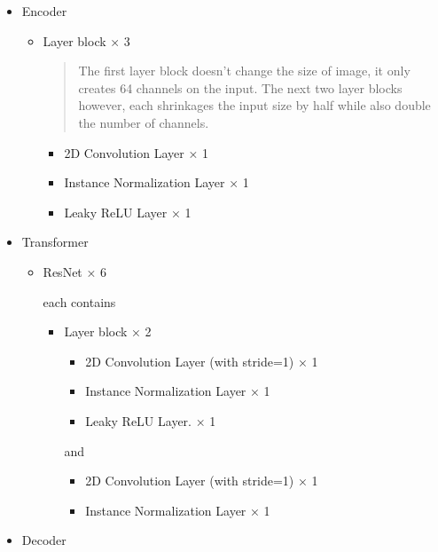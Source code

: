 \documentclass[
]{article}
\begin{document}
\begin{itemize}
\item
  Encoder

  \begin{itemize}
  \item
    Layer block × 3

    \begin{quote}
    The first layer block doesn't change the size of image, it only
    creates 64 channels on the input. The next two layer blocks however,
    each shrinkages the input size by half while also double the number
    of channels.
    \end{quote}

    \begin{itemize}
    \item
      2D Convolution Layer × 1
    \item
      Instance Normalization Layer × 1
    \item
      Leaky ReLU Layer × 1
    \end{itemize}
  \end{itemize}
\item
  Transformer

  \begin{itemize}
  \item
    ResNet × 6

    each contains
    
    \begin{itemize}
    \item
      Layer block × 2

      \begin{itemize}
      \item
        2D Convolution Layer (with stride=1) × 1
      \item
        Instance Normalization Layer × 1
      \item
        Leaky ReLU Layer. × 1
      \end{itemize}

      and

      \begin{itemize}
      \item
        2D Convolution Layer (with stride=1) × 1
      \item
        Instance Normalization Layer × 1
      \end{itemize}
    \end{itemize}
  \end{itemize}
\item
  Decoder


\end{itemize}
\end{document}
